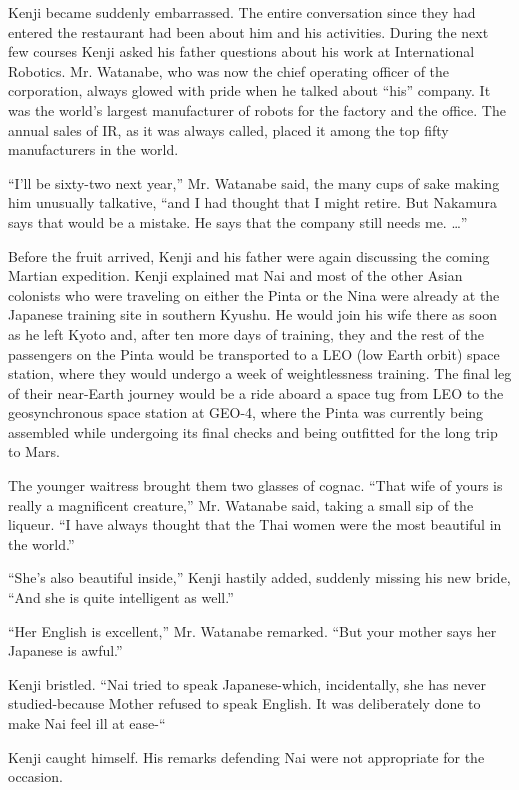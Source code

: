 \documentclass[]{article}
\begin{document}
{Kenji became suddenly embarrassed. The entire conversation since they had entered the restaurant had been about him and his activities. During the next few courses Kenji asked his father questions about his work at International Robotics. Mr. Watanabe, who was now the chief operating officer of the corporation, always glowed with pride when he talked about “his” company. It was the world’s largest manufacturer of robots for the factory and the office. The annual sales of IR, as it was always called, placed it among the top fifty manufacturers in the world.

“I’ll be sixty-two next year,” Mr. Watanabe said, the many cups of sake making him unusually talkative, “and I had thought that I might retire. But Nakamura says that would be a mistake. He says that the company still needs me. …”

Before the fruit arrived, Kenji and his father were again discussing the coming Martian expedition. Kenji explained mat Nai and most of the other Asian colonists who were traveling on either the Pinta or the Nina were already at the Japanese training site in southern Kyushu. He would join his wife there as soon as he left Kyoto and, after ten more days of training, they and the rest of the passengers on the Pinta would be transported to a LEO (low Earth orbit) space station, where they would undergo a week of weightlessness training. The final leg of their near-Earth journey would be a ride aboard a space tug from LEO to the geosynchronous space station at GEO-4, where the Pinta was currently being assembled while undergoing its final checks and being outfitted for the long trip to Mars.

The younger waitress brought them two glasses of cognac. “That wife of yours is really a magnificent creature,” Mr. Watanabe said, taking a small sip of the liqueur. “I have always thought that the Thai women were the most beautiful in the world.”

“She’s also beautiful inside,” Kenji hastily added, suddenly missing his new bride, “And she is quite intelligent as well.”

“Her English is excellent,” Mr. Watanabe remarked. “But your mother says her Japanese is awful.”

Kenji bristled. “Nai tried to speak Japanese-which, incidentally, she has never studied-because Mother refused to speak English. It was deliberately done to make Nai feel ill at ease-“

Kenji caught himself. His remarks defending Nai were not appropriate for the occasion.

}
\end{document}
